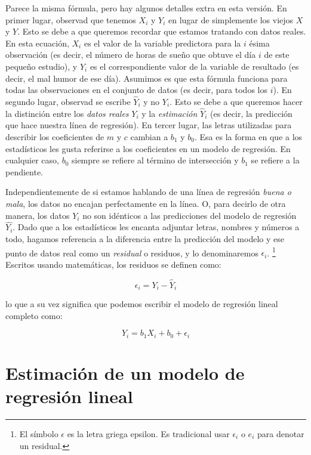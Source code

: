 \documentclass[
]{book}
\begin{document}
Parece la misma fórmula, pero hay algunos detalles extra en esta versión. En primer lugar, observad que tenemos \(X_i\) y \(Y_i\) en lugar de simplemente los viejos \(X\) y \(Y\). Esto se debe a que queremos recordar que estamos tratando con datos reales. En esta ecuación, \(X_i\) es el valor de la variable predictora para la \(i\) ésima observación (es decir, el número de horas de sueño que obtuve el día \(i\) de este pequeño estudio), y \(Y_i\) es el correspondiente valor de la variable de resultado (es decir, el mal humor de ese día). Asumimos es que esta fórmula funciona para todas las observaciones en el conjunto de datos (es decir, para todos los \(i\)). En segundo lugar, observad se escribe \(\hat{Y}_i\) y no \(Y_i\). Esto se debe a que queremos hacer la distinción entre los \emph{datos reales} \(Y_i\) y la \emph{estimación} \(\hat{Y}_i\) (es decir, la predicción que hace nuestra línea de regresión). En tercer lugar, las letras utilizadas para describir los coeficientes de \(m\) y \(c\) cambian a \(b_1\) y \(b_0\). Esa es la forma en que a los estadísticos les gusta referirse a los coeficientes en un modelo de regresión. En cualquier caso, \(b_0\) siempre se refiere al término de intersección y \(b_1\) se refiere a la pendiente.

Independientemente de si estamos hablando de una línea de regresión \emph{buena o mala}, los datos no encajan perfectamente en la línea. O, para decirlo de otra manera, los datos \(Y_i\) no son idénticos a las predicciones del modelo de regresión \(\hat{Y_i}\). Dado que a los estadísticos les encanta adjuntar letras, nombres y números a todo, hagamos referencia a la diferencia entre la predicción del modelo y ese punto de datos real como un \emph{residual} o residuos, y lo denominaremos \(\epsilon_i\). \footnote{El símbolo \(\epsilon\) es la letra griega epsilon. Es tradicional usar \(\epsilon_i\) o \(e_i\) para denotar un residual.} Escritos usando matemáticas, los residuos se definen como:

\[
\epsilon_i = Y_i - \hat{Y}_i
\]

lo que a su vez significa que podemos escribir el modelo de regresión lineal completo como:

\[
Y_i = b_1 X_i + b_0 + \epsilon_i
\]

\hypertarget{regressionestimation}{%
\section{Estimación de un modelo de regresión lineal}\label{regressionestimation}}
\end{document}
